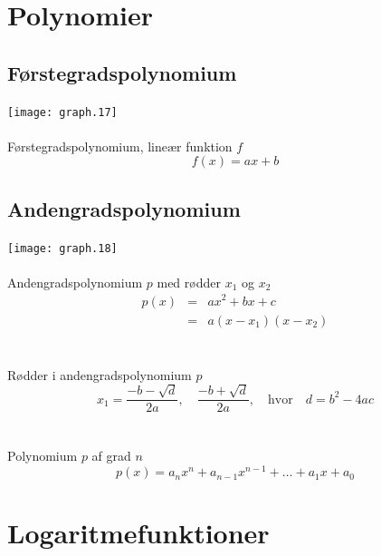 \documentclass[11pt,a5paper,fleqn,leqno]{book}
\begin{document}
\newpage

\section{Polynomier}

\subsection{Førstegradspolynomium}

\texttt{[image: graph.17]}
\\
\\
Førstegradspolynomium, lineær funktion $f$
\begin{equation}
f(x) = ax+b
\end{equation}

\newpage

\subsection{Andengradspolynomium}

\texttt{[image: graph.18]}
\\
\\
Andengradspolynomium $p$ med rødder $x_1$ og $x_2$
\begin{eqnarray}
p(x) & = & ax^2 + bx + c \\
 & = & a(x-x_1)(x-x_2) \nonumber
\end{eqnarray}
\\
\\
Rødder i andengradspolynomium $p$
\begin{equation}
x_1 = \frac{-b - \sqrt{d}}{2a}, \quad \frac{-b + \sqrt{d}}{2a}, \quad \text{hvor} \quad d = b^2 - 4ac
\end{equation}
\\
\\
Polynomium $p$ af grad $n$
\begin{equation}
p(x) = a_nx^n + a_{n-1}x^{n-1} + \dots + a_1x + a_0
\end{equation}

\vfill

\section{Logaritmefunktioner}
\end{document}
